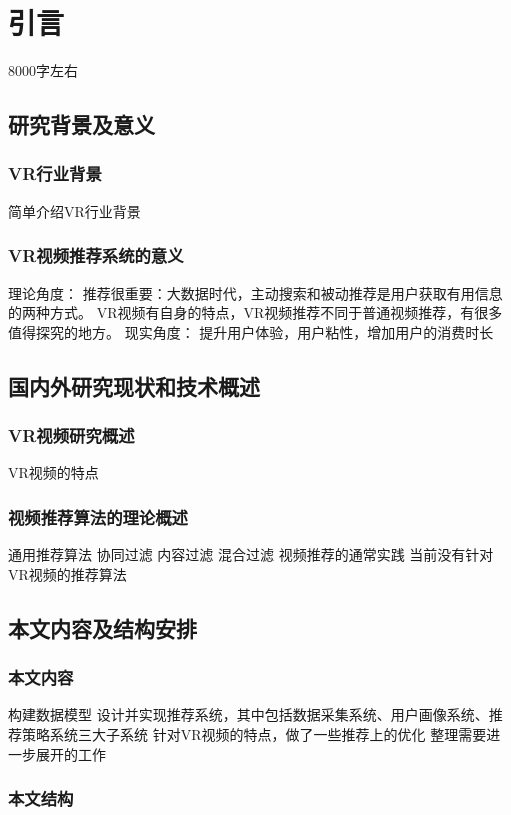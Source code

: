 \chapter{引言}
\label{cha:intro}

8000字左右

\section{研究背景及意义}

\subsection{VR行业背景}
简单介绍VR行业背景

\subsection{VR视频推荐系统的意义}
理论角度：
推荐很重要：大数据时代，主动搜索和被动推荐是用户获取有用信息的两种方式。
VR视频有自身的特点，VR视频推荐不同于普通视频推荐，有很多值得探究的地方。
现实角度：
提升用户体验，用户粘性，增加用户的消费时长

\section{国内外研究现状和技术概述}

\subsection{VR视频研究概述}
VR视频的特点

\subsection{视频推荐算法的理论概述}
通用推荐算法
协同过滤
内容过滤
混合过滤
视频推荐的通常实践
当前没有针对VR视频的推荐算法

\section{本文内容及结构安排}
\subsection{本文内容}
构建数据模型
设计并实现推荐系统，其中包括数据采集系统、用户画像系统、推荐策略系统三大子系统
针对VR视频的特点，做了一些推荐上的优化
整理需要进一步展开的工作

\subsection{本文结构}
